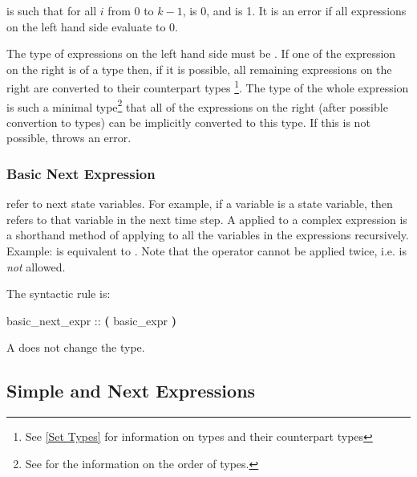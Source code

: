 \noindent is  such that for all $i$ from
$0$ to $k-1$,  is 0, and
 is 1.
%
It is an error if all expressions on the left hand side evaluate to 0.


The type of expressions on the left hand side must be \Boolean.  If
one of the expression on the right is of a \Set type then, if it is
possible, all remaining expressions on the right are converted to
their counterpart \Set types \footnote{See \ref{Set Types} for
information on \Set types and their counterpart types}. The type of
the whole expression is such a minimal type\footnote{See  for the information on the order of types.} that all of the
expressions on the right (after possible convertion to \Set types) can
be implicitly converted to this type.
%
If this is not possible, \nusmv throws an error.

\subsubsection{Basic Next Expression}
\label{Basic Next Expression}

 refer to next state variables. 
%
For example, if a variable  is a state variable, then
 refers to that variable  in
the next time step.
%
A  applied to a complex expression is a
shorthand method of applying  to all the variables in
the expressions recursively.
%
Example:  is equivalent to
.
%
Note that the  operator cannot be applied twice, i.e.
 is \emph{not} allowed.

The syntactic rule is:

\begin{Grammar}
basic_next_expr ::  \textbf{(} basic_expr \textbf{)}
\end{Grammar}
%
A  does not change the type.

\subsection{Simple and Next Expressions}
\label{Simple and Next Expressions}

